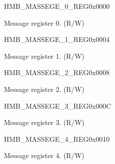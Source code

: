 \begin{register}{H}{MB\_MASSEGE\_0\_REG}{0x0000}\label{regdesc:MBMESSAGE0REG}
%
\regnewline%
\begin{regdesc}\begin{reglist}
\label{fielddesc:MBMESSAGE0}\item [MB\_MASSEGE\_0] Message register 0. (R/W)
\end{reglist}\end{regdesc}
\end{register}


\begin{register}{H}{MB\_MASSEGE\_1\_REG}{0x0004}\label{regdesc:MBMESSAGE1REG}
%
\regnewline%
\begin{regdesc}\begin{reglist}
\label{fielddesc:MBMESSAGE1}\item [MB\_MASSEGE\_1] Message register 1. (R/W)
\end{reglist}\end{regdesc}
\end{register}


\begin{register}{H}{MB\_MASSEGE\_2\_REG}{0x0008}\label{regdesc:MBMESSAGE2REG}
%
\regnewline%
\begin{regdesc}\begin{reglist}
\label{fielddesc:MBMESSAGE2}\item [MB\_MASSEGE\_2] Message register 2. (R/W)
\end{reglist}\end{regdesc}
\end{register}


\begin{register}{H}{MB\_MASSEGE\_3\_REG}{0x000C}\label{regdesc:MBMESSAGE3REG}
%
\regnewline%
\begin{regdesc}\begin{reglist}
\label{fielddesc:MBMESSAGE3}\item [MB\_MASSEGE\_3] Message register 3. (R/W)
\end{reglist}\end{regdesc}
\end{register}


\begin{register}{H}{MB\_MASSEGE\_4\_REG}{0x0010}\label{regdesc:MBMESSAGE4REG}
%
\regnewline%
\begin{regdesc}\begin{reglist}
\label{fielddesc:MBMESSAGE4}\item [MB\_MASSEGE\_4] Message register 4. (R/W)
\end{reglist}\end{regdesc}
\end{register}


